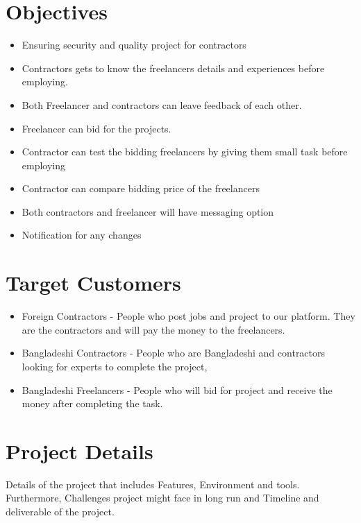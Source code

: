 \documentclass{article}
\begin{document}
\section{Objectives}
\begin{itemize}
\item  
Ensuring security and quality project for contractors
\item 
Contractors gets to know the freelancers details and experiences before employing.
\item
Both Freelancer and contractors can leave feedback of each other.
\item
Freelancer can bid for the projects.
\item
Contractor can test the bidding freelancers by giving them small task before employing
\item
Contractor can compare bidding price of the freelancers
\item 
Both contractors and freelancer will have messaging option
\item
Notification for any changes
\end{itemize}

\section{Target Customers}
\begin{itemize}
\item  
Foreign Contractors - People who post jobs and project to our platform. They are the contractors and will pay the money to the freelancers.
\item 
Bangladeshi Contractors - People who are Bangladeshi and contractors looking for experts to complete the project,
\item
Bangladeshi Freelancers - People who will bid for project and receive the money after completing the task.

\end{itemize}
\section{Project Details}
Details of the project that includes Features, Environment and tools. Furthermore, Challenges project might face in long run and Timeline and deliverable of the project.
\end{document}
